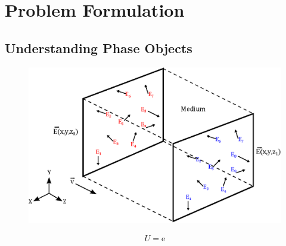 \section{Problem Formulation}
\subsection{Understanding Phase Objects}

\begin{figure}[h]
	\centering
	\includegraphics[scale=1]{figures/field_prop.eps}
\end{figure}

\begin{eqnarray}
U = \mathrm{e}
\end{eqnarray}